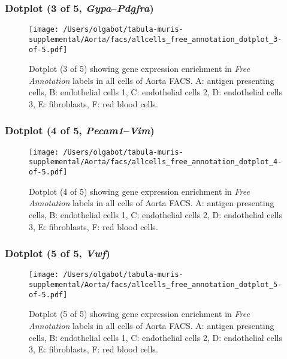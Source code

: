 \clearpage

\subsubsection{Dotplot (3 of 5, \emph{Gypa}--\emph{Pdgfra})}
\begin{figure}[h]
\centering
\texttt{[image: /Users/olgabot/tabula-muris-supplemental/Aorta/facs/allcells\_free\_annotation\_dotplot\_3-of-5.pdf]}

\caption{ Dotplot (3 of 5)  showing gene expression enrichment in \emph{Free Annotation} labels in all cells of Aorta FACS. A: antigen presenting cells, B: endothelial cells 1, C: endothelial cells 2, D: endothelial cells 3, E: fibroblasts, F: red blood cells.}
\end{figure}


\clearpage

\subsubsection{Dotplot (4 of 5, \emph{Pecam1}--\emph{Vim})}
\begin{figure}[h]
\centering
\texttt{[image: /Users/olgabot/tabula-muris-supplemental/Aorta/facs/allcells\_free\_annotation\_dotplot\_4-of-5.pdf]}

\caption{ Dotplot (4 of 5)  showing gene expression enrichment in \emph{Free Annotation} labels in all cells of Aorta FACS. A: antigen presenting cells, B: endothelial cells 1, C: endothelial cells 2, D: endothelial cells 3, E: fibroblasts, F: red blood cells.}
\end{figure}


\clearpage

\subsubsection{Dotplot (5 of 5, \emph{Vwf})}
\begin{figure}[h]
\centering
\texttt{[image: /Users/olgabot/tabula-muris-supplemental/Aorta/facs/allcells\_free\_annotation\_dotplot\_5-of-5.pdf]}

\caption{ Dotplot (5 of 5)  showing gene expression enrichment in \emph{Free Annotation} labels in all cells of Aorta FACS. A: antigen presenting cells, B: endothelial cells 1, C: endothelial cells 2, D: endothelial cells 3, E: fibroblasts, F: red blood cells.}
\end{figure}


